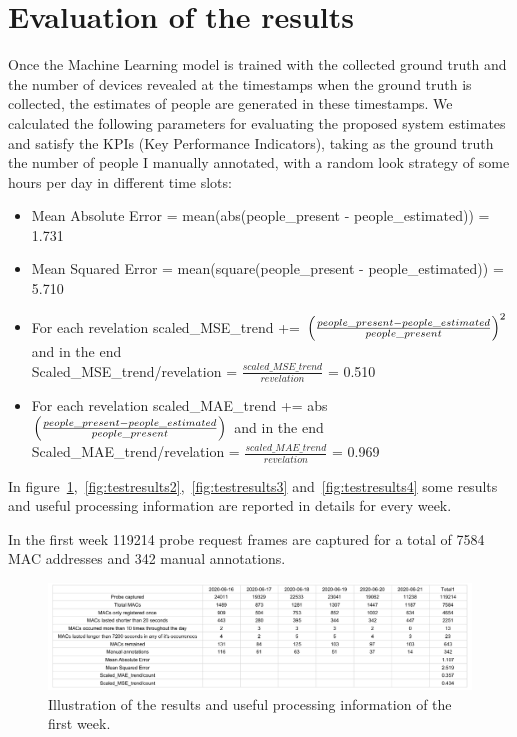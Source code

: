 \section{Evaluation of the results}
\label{sec:evalres}
\vspace{0.2 cm} 

Once the Machine Learning model is trained with the collected ground truth and the number of devices revealed at the timestamps when the ground truth is collected, the estimates of people are generated in these timestamps. We calculated the following parameters for evaluating the proposed system estimates and satisfy the KPIs (Key Performance Indicators), taking as the ground truth the number of people I manually annotated, with a random look strategy of some hours per day in different time slots:
\begin{itemize}
  \item Mean Absolute Error = mean(abs(people\_present - people\_estimated)) = 1.731
  \item Mean Squared Error = mean(square(people\_present - people\_estimated)) = 5.710
  \item For each revelation scaled\_MSE\_trend += $\Bigl(\frac{people\_present - people\_estimated}{people\_present} \Bigr)^{2}$ and in the end\\Scaled\_MSE\_trend/revelation = $\frac{scaled\_MSE\_trend}{revelation}$ = 0.510
  \item For each revelation scaled\_MAE\_trend += abs$\Bigl(\frac{people\_present - people\_estimated}{people\_present} \Bigr)$ and in the end\\Scaled\_MAE\_trend/revelation = $\frac{scaled\_MAE\_trend}{revelation}$ = 0.969
\end{itemize}

In figure~\ref{fig:testresults1},~\ref{fig:testresults2},~\ref{fig:testresults3} and~\ref{fig:testresults4} some results and useful processing information are reported in details for every week.

In the first week 119214 probe request frames are captured for a total of 7584 MAC addresses and 342 manual annotations.

\begin{figure}[H]
\centering 
\includegraphics[width=1\textwidth]{images/testresults1} 
\caption{Illustration of the results and useful processing information of the first week.}
\label{fig:testresults1}
\end{figure}

